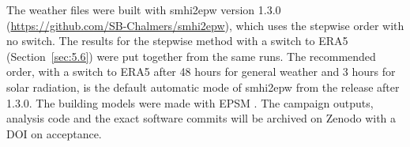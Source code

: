 The weather files were built with smhi2epw version 1.3.0 (\url{https://github.com/SB-Chalmers/smhi2epw}), which uses the stepwise order with no switch. The results for the stepwise method with a switch to ERA5 (Section~\ref{sec:5.6}) were put together from the same runs. The recommended order, with a switch to ERA5 after 48 hours for general weather and 3 hours for solar radiation, is the default automatic mode of smhi2epw from the release after 1.3.0. The building models were made with EPSM \citep{sbchalmers2026}. The campaign outputs, analysis code and the exact software commits will be archived on Zenodo with a DOI on acceptance.
